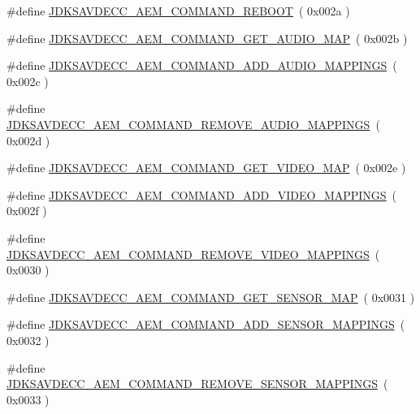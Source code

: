 \begin{DoxyCompactItemize}
\item 
\#define \hyperlink{group__command_ga859da6235182638521da6af153bc6d3c}{J\+D\+K\+S\+A\+V\+D\+E\+C\+C\+\_\+\+A\+E\+M\+\_\+\+C\+O\+M\+M\+A\+N\+D\+\_\+\+R\+E\+B\+O\+OT}~( 0x002a )
\item 
\#define \hyperlink{group__command_ga5d806d56b7dfd0104e5e127c910dbb65}{J\+D\+K\+S\+A\+V\+D\+E\+C\+C\+\_\+\+A\+E\+M\+\_\+\+C\+O\+M\+M\+A\+N\+D\+\_\+\+G\+E\+T\+\_\+\+A\+U\+D\+I\+O\+\_\+\+M\+AP}~( 0x002b )
\item 
\#define \hyperlink{group__command_gac872db287b8e91225b52129c617e1da0}{J\+D\+K\+S\+A\+V\+D\+E\+C\+C\+\_\+\+A\+E\+M\+\_\+\+C\+O\+M\+M\+A\+N\+D\+\_\+\+A\+D\+D\+\_\+\+A\+U\+D\+I\+O\+\_\+\+M\+A\+P\+P\+I\+N\+GS}~( 0x002c )
\item 
\#define \hyperlink{group__command_gae6ee643ac7127012a5a4cc44813f52c7}{J\+D\+K\+S\+A\+V\+D\+E\+C\+C\+\_\+\+A\+E\+M\+\_\+\+C\+O\+M\+M\+A\+N\+D\+\_\+\+R\+E\+M\+O\+V\+E\+\_\+\+A\+U\+D\+I\+O\+\_\+\+M\+A\+P\+P\+I\+N\+GS}~( 0x002d )
\item 
\#define \hyperlink{group__command_ga7b24e9507d79230cd329ba89d4a57678}{J\+D\+K\+S\+A\+V\+D\+E\+C\+C\+\_\+\+A\+E\+M\+\_\+\+C\+O\+M\+M\+A\+N\+D\+\_\+\+G\+E\+T\+\_\+\+V\+I\+D\+E\+O\+\_\+\+M\+AP}~( 0x002e )
\item 
\#define \hyperlink{group__command_gad08496bad2c6df38d144ab40ca8f11a5}{J\+D\+K\+S\+A\+V\+D\+E\+C\+C\+\_\+\+A\+E\+M\+\_\+\+C\+O\+M\+M\+A\+N\+D\+\_\+\+A\+D\+D\+\_\+\+V\+I\+D\+E\+O\+\_\+\+M\+A\+P\+P\+I\+N\+GS}~( 0x002f )
\item 
\#define \hyperlink{group__command_ga5fcc75bca378578c2a8f282a4138b10d}{J\+D\+K\+S\+A\+V\+D\+E\+C\+C\+\_\+\+A\+E\+M\+\_\+\+C\+O\+M\+M\+A\+N\+D\+\_\+\+R\+E\+M\+O\+V\+E\+\_\+\+V\+I\+D\+E\+O\+\_\+\+M\+A\+P\+P\+I\+N\+GS}~( 0x0030 )
\item 
\#define \hyperlink{group__command_ga9d2cd776874a107a87ea7301dbf3b50e}{J\+D\+K\+S\+A\+V\+D\+E\+C\+C\+\_\+\+A\+E\+M\+\_\+\+C\+O\+M\+M\+A\+N\+D\+\_\+\+G\+E\+T\+\_\+\+S\+E\+N\+S\+O\+R\+\_\+\+M\+AP}~( 0x0031 )
\item 
\#define \hyperlink{group__command_gade9dfca1885ab2bf4c39a3e0c64ace6d}{J\+D\+K\+S\+A\+V\+D\+E\+C\+C\+\_\+\+A\+E\+M\+\_\+\+C\+O\+M\+M\+A\+N\+D\+\_\+\+A\+D\+D\+\_\+\+S\+E\+N\+S\+O\+R\+\_\+\+M\+A\+P\+P\+I\+N\+GS}~( 0x0032 )
\item 
\#define \hyperlink{group__command_ga94c977e26cadad2593edb6259455b5a2}{J\+D\+K\+S\+A\+V\+D\+E\+C\+C\+\_\+\+A\+E\+M\+\_\+\+C\+O\+M\+M\+A\+N\+D\+\_\+\+R\+E\+M\+O\+V\+E\+\_\+\+S\+E\+N\+S\+O\+R\+\_\+\+M\+A\+P\+P\+I\+N\+GS}~( 0x0033 )
\item 

\end{DoxyCompactItemize}
